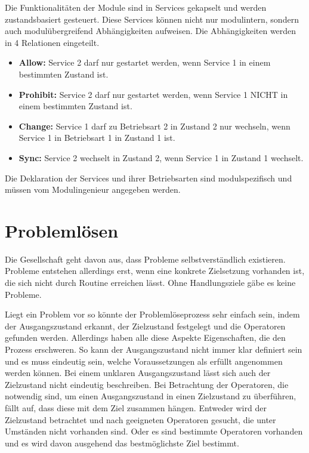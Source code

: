 Die Funktionalitäten der Module sind in Services gekapselt und werden zustandsbasiert gesteuert. Diese Services können nicht nur modulintern, sondern auch modulübergreifend Abhängigkeiten aufweisen. Die Abhängigkeiten werden in 4 Relationen eingeteilt.
\begin{itemize}
\item \textbf{Allow:} Service 2 darf nur gestartet werden, wenn Service 1 in einem bestimmten Zustand ist.
\item \textbf{Prohibit:} Service 2 darf nur gestartet werden, wenn Service 1 NICHT in einem bestimmten Zustand ist.
\item \textbf{Change:} Service 1 darf zu Betriebsart 2 in Zustand 2 nur wechseln, wenn Service 1 in Betriebsart 1 in Zustand 1 ist.
\item \textbf{Sync:} Service 2 wechselt in Zustand 2, wenn Service 1 in Zustand 1 wechselt.
\end{itemize} 
Die Deklaration der Services und ihrer Betriebsarten sind modulspezifisch und müssen vom Modulingenieur angegeben werden. \cite{Ladiges2018}


\section{Problemlösen}
Die Gesellschaft geht davon aus, dass Probleme selbstverständlich existieren. Probleme entstehen allerdings erst, wenn eine konkrete Zielsetzung vorhanden ist, die sich nicht durch Routine erreichen lässt. Ohne Handlungsziele gäbe es keine Probleme. \cite{Funke2015, Betsch2011,  Dorner1984}

Liegt ein Problem vor so könnte der Problemlöseprozess sehr einfach sein, indem der Ausgangszustand erkannt, der Zielzustand festgelegt und die Operatoren gefunden werden. Allerdings haben alle diese Aspekte Eigenschaften, die den Prozess erschweren. So kann der Ausgangszustand nicht immer klar definiert sein und es muss eindeutig sein, welche Voraussetzungen als erfüllt angenommen werden können. Bei einem unklaren Ausgangszustand lässt sich auch der Zielzustand nicht eindeutig beschreiben. Bei Betrachtung der Operatoren, die notwendig sind, um einen Ausgangszustand in einen Zielzustand zu überführen, fällt auf, dass diese mit dem Ziel zusammen hängen. Entweder wird der Zielzustand betrachtet und nach geeigneten Operatoren gesucht, die unter Umständen nicht vorhanden sind. Oder es sind bestimmte Operatoren vorhanden und es wird davon ausgehend das bestmöglichste Ziel bestimmt. \cite{Funke2015}

